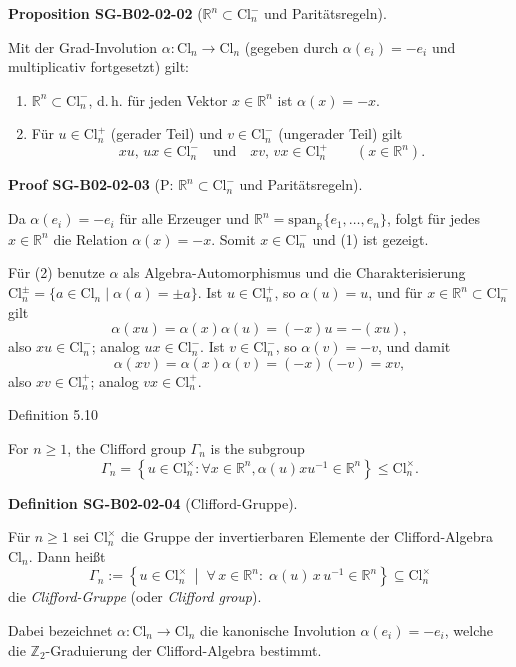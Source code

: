 \documentclass[10pt, letterpaper]{article}
\newcommand{\R}{\mathbb{R}}
\newcommand{\Cl}{\mathrm{Cl}}
\newcommand{\CustomHeading}[3]{%
  \par\medskip\noindent%
  \textbf{#1 #2} \textnormal{(#3)}.\enskip%
}
\newenvironment{DEF}[2]{\begin{unitbox}\CustomHeading{Definition}{#1}{#2}}{\end{unitbox}}
\newenvironment{PROP}[2]{\begin{unitbox}\CustomHeading{Proposition}{#1}{#2}}{\end{unitbox}}
\newenvironment{PROOF}[2]{\begin{unitbox}\CustomHeading{Proof}{#1}{#2}}{\end{unitbox}}
\begin{document}
\begin{PROP}{SG-B02-02-02}{\(\R^n\subset \Cl_n^{-}\) und Paritätsregeln}
Mit der Grad-Involution \(\alpha:\Cl_n\to\Cl_n\) (gegeben durch \(\alpha(e_i)=-e_i\) und multiplicativ fortgesetzt) gilt:
\begin{enumerate}
\item \(\R^n\subset \Cl_n^{-}\), d.\,h. für jeden Vektor \(x\in \R^n\) ist \(\alpha(x)=-x\).
\item Für \(u\in \Cl_n^{+}\) (gerader Teil) und \(v\in \Cl_n^{-}\) (ungerader Teil) gilt
\[
xu,\,ux\in \Cl_n^{-}
\quad\text{und}\quad
xv,\,vx\in \Cl_n^{+}
\qquad(x\in \R^n).
\]
\end{enumerate}
\end{PROP}



\begin{PROOF}{SG-B02-02-03}{P: \(\R^n\subset \Cl_n^{-}\) und Paritätsregeln}
Da \(\alpha(e_i)=-e_i\) für alle Erzeuger und \(\R^n=\mathrm{span}_\R\{e_1,\dots,e_n\}\), folgt für jedes
\(x\in \R^n\) die Relation \(\alpha(x)=-x\). Somit \(x\in \Cl_n^{-}\) und (1) ist gezeigt.

Für (2) benutze \(\alpha\) als Algebra-Automorphismus und die Charakterisierung
\(\Cl_n^{\pm}=\{a\in\Cl_n\mid \alpha(a)=\pm a\}\).
Ist \(u\in \Cl_n^{+}\), so \(\alpha(u)=u\), und für \(x\in\R^n\subset\Cl_n^{-}\) gilt
\[
\alpha(xu)=\alpha(x)\alpha(u)=(-x)u=-(xu),
\]
also \(xu\in \Cl_n^{-}\); analog \(ux\in \Cl_n^{-}\).
Ist \(v\in \Cl_n^{-}\), so \(\alpha(v)=-v\), und damit
\[
\alpha(xv)=\alpha(x)\alpha(v)=(-x)(-v)=xv,
\]
also \(xv\in \Cl_n^{+}\); analog \(vx\in \Cl_n^{+}\).
\end{PROOF}


Definition 5.10


For $n \geqslant 1$, the Clifford group $\Gamma_{n}$ is the subgroup
$$
\Gamma_{n}=\left\{u \in \mathrm{Cl}_{n}^{\times}: \forall x \in \mathbb{R}^{n}, \alpha(u) x u^{-1} \in \mathbb{R}^{n}\right\} \leqslant \mathrm{Cl}_{n}^{\times} .
$$


\begin{DEF}{SG-B02-02-04}{Clifford-Gruppe}
Für \(n \geq 1\) sei \(\Cl_n^{\times}\) die Gruppe der invertierbaren Elemente der Clifford-Algebra \(\Cl_n\).  
Dann heißt
\[
\Gamma_n
:= 
\left\{
u \in \Cl_n^{\times} \;\middle|\;
\forall\, x \in \R^n:\;
\alpha(u)\, x\, u^{-1} \in \R^n
\right\}
\subseteq \Cl_n^{\times}
\]
die \emph{Clifford-Gruppe} (oder \emph{Clifford group}).

\medskip
\noindent
Dabei bezeichnet \(\alpha:\Cl_n \to \Cl_n\) die kanonische Involution
\(\alpha(e_i)=-e_i\), welche die \(\mathbb{Z}_2\)-Graduierung der Clifford-Algebra bestimmt.
\end{DEF}
\end{document}
